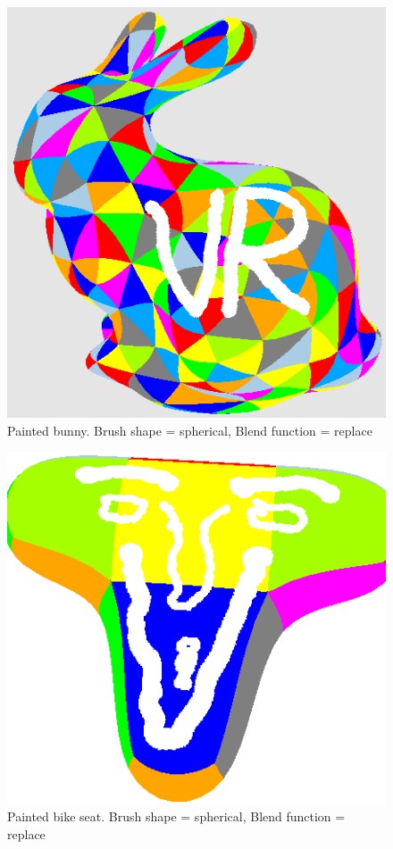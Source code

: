 \documentclass[10pt,twocolumn]{article}
\begin{document}
\begin{figure}
\begin{center}
\includegraphics[scale=0.5]{VRBunny1.png}
\caption{Painted bunny. Brush shape = spherical, Blend function = replace }
\label{VRBunny1}
\end{center}
\end{figure}

\begin{figure}
\begin{center}
\includegraphics[scale=0.50]{face1.png}
\caption{Painted bike seat. Brush shape = spherical, Blend function = replace }
\label{VRFace}
\end{center}
\end{figure}
\end{document}
